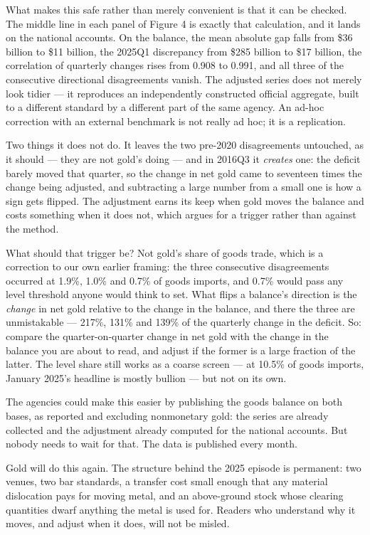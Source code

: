 \documentclass[11pt]{article}
\begin{document}
What makes this safe rather than merely convenient is that it can be checked.
The middle line in each panel of Figure 4 is exactly that calculation, and it
lands on the national accounts. On the balance, the mean absolute gap falls from
\$36 billion to \$11 billion, the 2025Q1 discrepancy from \$285 billion to \$17
billion, the correlation of quarterly changes rises from 0.908 to 0.991, and all
three of the consecutive directional disagreements vanish. The adjusted series
does not merely look tidier --- it reproduces an independently constructed
official aggregate, built to a different standard by a different part of the
same agency. An ad-hoc correction with an external benchmark is not really ad
hoc; it is a replication.

Two things it does not do. It leaves the two pre-2020 disagreements untouched,
as it should --- they are not gold's doing --- and in 2016Q3 it \emph{creates}
one: the deficit barely moved that quarter, so the change in net gold came to
seventeen times the change being adjusted, and subtracting a large number from a
small one is how a sign gets flipped. The adjustment earns its keep when gold
moves the balance and costs something when it does not, which argues for a
trigger rather than against the method.

What should that trigger be? Not gold's share of goods trade, which is a
correction to our own earlier framing: the three consecutive disagreements
occurred at 1.9\%, 1.0\% and 0.7\% of goods imports, and 0.7\% would pass any
level threshold anyone would think to set. What flips a balance's direction is
the \emph{change} in net gold relative to the change in the balance, and there
the three are unmistakable --- 217\%, 131\% and 139\% of the quarterly change in
the deficit. So: compare the quarter-on-quarter change in net gold with the
change in the balance you are about to read, and adjust if the former is a large
fraction of the latter. The level share still works as a coarse screen --- at
10.5\% of goods imports, January 2025's headline is mostly bullion --- but not
on its own.

The agencies could make this easier by publishing the goods balance on both
bases, as reported and excluding nonmonetary gold: the series are already
collected and the adjustment already computed for the national accounts. But
nobody needs to wait for that. The data is published every month.

Gold will do this again. The structure behind the 2025 episode is permanent:
two venues, two bar standards, a transfer cost small enough that any material
dislocation pays for moving metal, and an above-ground stock whose clearing
quantities dwarf anything the metal is used for. Readers who understand why it
moves, and adjust when it does, will not be misled.

\clearpage
\theendnotes
\end{document}
